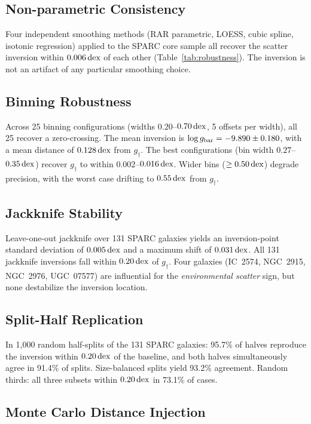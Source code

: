 \documentclass[twocolumn,twocolappendix]{aastex631}
\newcommand{\gbar}{g_{\rm bar}}
\newcommand{\gdag}{g_{\dagger}}
\newcommand{\dex}{\,{\rm dex}}
\begin{document}
\subsection{Non-parametric Consistency}

Four independent smoothing methods (RAR parametric, LOESS, cubic spline,
isotonic regression) applied to the SPARC core sample all recover the
scatter inversion within $0.006\dex$ of each other
(Table~\ref{tab:robustness}). The inversion is not an artifact of any
particular smoothing choice.

\subsection{Binning Robustness}

Across 25 binning configurations (widths $0.20$--$0.70\dex$, 5 offsets per
width), all 25 recover a zero-crossing. The mean inversion is
$\log\gbar = -9.890 \pm 0.180$, with a mean distance of $0.128\dex$ from
$\gdag$. The best configurations (bin width $0.27$--$0.35\dex$) recover
$\gdag$ to within $0.002$--$0.016\dex$. Wider bins ($\geq 0.50\dex$)
degrade precision, with the worst case drifting to $0.55\dex$ from $\gdag$.

\subsection{Jackknife Stability} \label{sec:jackknife}

Leave-one-out jackknife over 131 SPARC galaxies yields an inversion-point
standard deviation of $0.005\dex$ and a maximum shift of $0.031\dex$. All
131 jackknife inversions fall within $0.20\dex$ of $\gdag$. Four galaxies
(IC~2574, NGC~2915, NGC~2976, UGC~07577) are influential for the
\emph{environmental scatter} sign, but none destabilize the inversion
location.

\subsection{Split-Half Replication}

In 1{,}000 random half-splits of the 131 SPARC galaxies: 95.7\% of halves
reproduce the inversion within $0.20\dex$ of the baseline, and both halves
simultaneously agree in 91.4\% of splits. Size-balanced splits yield 93.2\%
agreement. Random thirds: all three subsets within $0.20\dex$ in 73.1\% of
cases.

\subsection{Monte Carlo Distance Injection}
\end{document}
